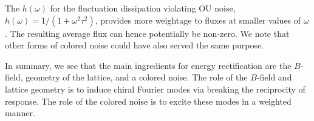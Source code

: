 \documentclass[
 preprint,
 preprintnumbers,
 amsmath,amssymb,
 aps,
 pre,
 longbibliography,
 superscriptaddress,
 10pt, twocolumn
]{revtex4-1}
\begin{document}
The $h(\omega)$ for the fluctuation dissipation violating OU noise, $h(\omega)=1/(1+\omega^2\tau^2)$, provides more weightage to fluxes at smaller values of $\omega$. The resulting average flux can hence potentially be non-zero. We note that other forms of colored noise could have also served the same purpose. %

In summary, we see that the main ingredients for energy rectification are the $B$-field, geometry of the lattice, and a colored noise.
The role of the $B$-field and lattice geometry is to induce chiral Fourier modes via breaking the reciprocity of response. The role of the colored noise is to excite these modes in a weighted manner.
\end{document}
